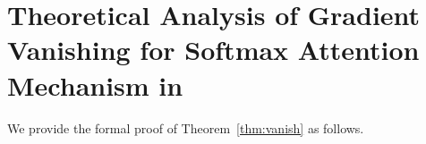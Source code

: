 \appendices
\setcounter{section}{0}
\renewcommand{\thesubsection}{\Alph{subsection}} 
\renewcommand{\thesubsubsection}{\thesection.\arabic{subsection}}

\newpage %







\section{Theoretical Analysis of Gradient Vanishing for Softmax Attention Mechanism in \cite{song2020information} }
\label{appendix:ccs20_vanish_theory}
We provide the formal proof of Theorem~\ref{thm:vanish}  as follows. 
